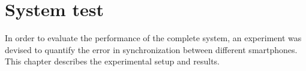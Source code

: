 \documentclass[a4paper, notitlepage]{report}
\begin{document}
\chapter{System test}
\label{ch:test}
In order to evaluate the performance of the complete system, an experiment was devised to quantify the error in synchronization between different smartphones. This chapter describes the experimental setup and results.
\end{document}
